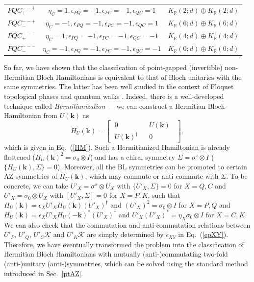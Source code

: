 \documentclass{tADP2e}
\theoremstyle{plain}
\theoremstyle{plain}
\theoremstyle{definition}
\begin{document}
\begin{table}[tbp]
\begin{center}
\begin{tabular}{ccc}
$PQC^{--+}_+$ & %
$\eta_C=1,\epsilon_{PQ}=-1,\epsilon_{PC}=-1,\epsilon_{QC}=1$ & $K_\mathbb{R}(2;d)\oplus K_\mathbb{R}(2;d)$ \\
$PQC^{--+}_-$ & %
$\eta_C=-1,\epsilon_{PQ}=-1,\epsilon_{PC}=-1,\epsilon_{QC}=1$ & $K_\mathbb{R}(6;d)\oplus K_\mathbb{R}(6;d)$ \\
$PQC^{---}_+$ & %
$\eta_C=1,\epsilon_{PQ}=-1,\epsilon_{PC}=-1,\epsilon_{QC}=-1$ & $K_\mathbb{R}(4;d)\oplus K_\mathbb{R}(4;d)$ \\
$PQC^{---}_-$ & %
$\eta_C=-1,\epsilon_{PQ}=-1,\epsilon_{PC}=-1,\epsilon_{QC}=-1$ & $K_\mathbb{R}(0;d)\oplus K_\mathbb{R}(0;d)$ \\
\hline\hline
\end{tabular}
\end{center}
\label{table3}
\end{table}


So far, we have shown that the classification of point-gapped (invertible) non-Hermitian Bloch Hamiltonians is equivalent to that of Bloch unitaries with the same symmetries. 
The latter has been well studied in the context of Floquet topological phases \cite{HF20} and quantum walks \cite{KT12}. Indeed, there is a well-developed technique called \emph{Hermitianization} --- we can construct a Hermitian Bloch Hamiltonian from $U(\boldsymbol{k})$ as \cite{HF17}
\begin{equation}
H_U(\boldsymbol{k})=\begin{bmatrix} \;0\; & \;\;U(\boldsymbol{k})\;\; \\ \;U(\boldsymbol{k})^\dag\; & \;\;0\;\; \end{bmatrix},
\label{HUk}
\end{equation}
which is given in Eq.~(\ref{HM}). Such a Hermitianized Hamiltonian is already flattened ($H_U(\boldsymbol{k})^2=\sigma_0\otimes I$) and has a chiral symmetry $\Sigma=\sigma^z\otimes I$ ($\{H_U(\boldsymbol{k}),\Sigma\}=0$). Moreover, all the BL symmetries can be promoted to certain AZ symmetries of $H_U(\boldsymbol{k})$, which may commute or anti-commute with $\Sigma$. To be concrete, we can take $U'_X=\sigma^x\otimes U_X$ with $\{U'_X,\Sigma\}=0$ for $X=Q,C$ and $U'_X=\sigma_0\otimes U_X$ with $[U'_X,\Sigma]=0$ for $X=P,K$, 
such that $H_U(\boldsymbol{k})=\epsilon_XU'_XH_U(\boldsymbol{k})(U'_X)^\dag$ and $(U'_X)^2=\sigma_0\otimes I$ for $X=P,Q$ and $H_U(\boldsymbol{k})=\epsilon_XU'_XH_U(-\boldsymbol{k})^*(U'_X)^\dag$ and $U'_X(U'_X)^*=\eta_X\sigma_0\otimes I$ for $X=C,K$. We can also check that the commutation and anti-commutation relations between $U'_P$, $U'_Q$, $U'_C\mathcal{K}$ and $U'_K\mathcal{K}$ are simply determined by $\epsilon_{XY}$ in Eq.~(\ref{epXY}). Therefore, we have eventually transformed the problem into the classification of Hermitian Bloch Hamiltonians with mutually (anti-)commutating two-fold (anti-)unitary (anti-)symmetries, which can be solved using the standard method introduced in Sec.~\ref{ptAZ}. 
\end{document}
